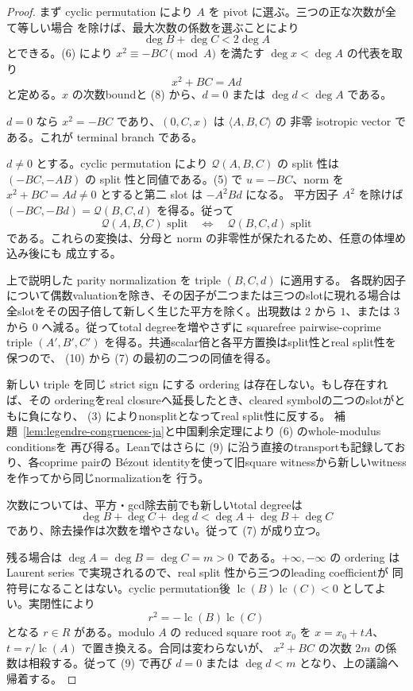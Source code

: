\documentclass[uplatex,dvipdfmx]{jsarticle}
\theoremstyle{definition}
\theoremstyle{remark}
\begin{document}
\begin{proof}
まず cyclic permutation により $A$ を pivot に選ぶ。三つの正な次数が全て等しい場合
を除けば、最大次数の係数を選ぶことにより
\[
  \deg B+\deg C<2\deg A                                \tag{8}
\]
とできる。(6) により $x^2\equiv-BC\pmod A$ を満たす $\deg x<\deg A$ の代表を取り
\[
  x^2+BC=Ad                                             \tag{9}
\]
と定める。$x$ の次数boundと (8) から、$d=0$ または $\deg d<\deg A$ である。

$d=0$ なら $x^2=-BC$ であり、$(0,C,x)$ は $\langle A,B,C\rangle$ の
非零 isotropic vector である。これが terminal branch である。

$d\ne0$ とする。cyclic permutation により $\mathcal Q(A,B,C)$ の split 性は
$(-BC,-AB)$ の split 性と同値である。(5) で $u=-BC$、norm を
$x^2+BC=Ad\ne0$ とすると第二 slot は $-A^2Bd$ になる。
平方因子 $A^2$ を除けば $(-BC,-Bd)=\mathcal Q(B,C,d)$ を得る。従って
\[
  \mathcal Q(A,B,C)\text{ split}
  \quad\Longleftrightarrow\quad
  \mathcal Q(B,C,d)\text{ split}                        \tag{10}
\]
である。これらの変換は、分母と norm の非零性が保たれるため、任意の体埋め込み後にも
成立する。

上で説明した parity normalization を triple $(B,C,d)$ に適用する。
各既約因子について偶数valuationを除き、その因子が二つまたは三つのslotに現れる場合は
全slotをその因子倍して新しく生じた平方を除く。出現数は $2$ から $1$、または $3$ から
$0$ へ減る。従ってtotal degreeを増やさずに squarefree pairwise-coprime triple
$(A',B',C')$ を得る。共通scalar倍と各平方置換はsplit性とreal split性を保つので、
(10) から (7) の最初の二つの同値を得る。

新しい triple を同じ strict sign にする ordering は存在しない。もし存在すれば、その
orderingをreal closureへ延長したとき、cleared symbolの二つのslotがともに負になり、
(3) によりnonsplitとなってreal split性に反する。
補題~\ref{lem:legendre-congruences-ja}と中国剰余定理により (6) のwhole-modulus conditionsを
再び得る。Leanではさらに (9) に沿う直接のtransportも記録しており、各coprime pairの
Bézout identityを使って旧square witnessから新しいwitnessを作ってから同じnormalizationを
行う。

次数については、平方・gcd除去前でも新しいtotal degreeは
\[
  \deg B+\deg C+\deg d
  <\deg A+\deg B+\deg C
\]
であり、除去操作は次数を増やさない。従って (7) が成り立つ。

残る場合は $\deg A=\deg B=\deg C=m>0$ である。$+\infty,-\infty$ の ordering は
Laurent series で実現されるので、real split 性から三つのleading coefficientが
同符号になることはない。cyclic permutation後
$\operatorname{lc}(B)\operatorname{lc}(C)<0$ としてよい。実閉性により
\[
  r^2=-\operatorname{lc}(B)\operatorname{lc}(C)
\]
となる $r\in R$ がある。modulo $A$ の reduced square root $x_0$ を
$x=x_0+tA$、$t=r/\operatorname{lc}(A)$ で置き換える。合同は変わらないが、
$x^2+BC$ の次数 $2m$ の係数は相殺する。従って (9) で再び
$d=0$ または $\deg d<m$ となり、上の議論へ帰着する。
\end{proof}
\end{document}
